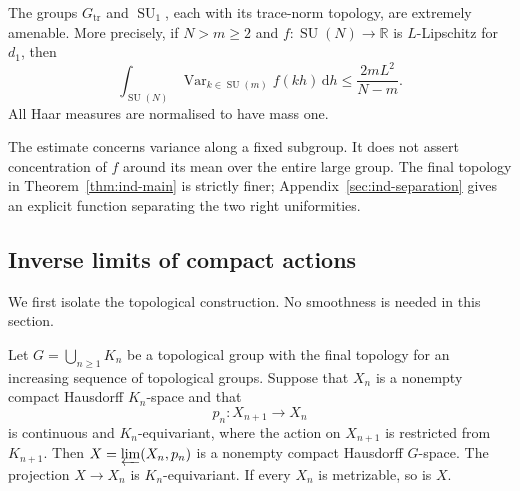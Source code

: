 \begin{theorem}\label{thm:ind-trace-intro}
The groups $G_{\mathrm{tr}}$ and $\operatorname{SU}_1$, each with its trace-norm topology, are
extremely amenable. More precisely, if
$N>m\ge2$ and $f:\operatorname{SU}(N)\to\mathbb R$ is $L$-Lipschitz for $d_1$, then
\begin{equation}\label{eq:ind-variance-intro}
\int_{\operatorname{SU}(N)}\operatorname{Var}_{k\in\operatorname{SU}(m)}f(kh)\,\mathrm d h
\le \frac{2mL^2}{N-m}.
\end{equation}
All Haar measures are normalised to have mass one.
\end{theorem}

The estimate concerns variance along a fixed subgroup. It does not
assert concentration of $f$ around its mean over the entire large
group. The final topology in Theorem~\ref{thm:ind-main} is strictly finer;
Appendix~\ref{sec:ind-separation} gives an explicit function separating
the two right uniformities.

\subsection{Inverse limits of compact actions}\label{sec:ind-inverse}

We first isolate the topological construction. No smoothness is needed
in this section.

\begin{lemma}\label{lem:ind-inverse-action}
Let $G=\bigcup_{n\ge1}K_n$ be a topological group with the final
topology for an increasing sequence of topological groups. Suppose
that $X_n$ is a nonempty compact Hausdorff $K_n$-space and that
\[
p_n:X_{n+1}\longrightarrow X_n
\]
is continuous and $K_n$-equivariant, where the action on $X_{n+1}$ is
restricted from $K_{n+1}$. Then $X=\varprojlim(X_n,p_n)$ is a nonempty
compact Hausdorff $G$-space. The projection $X\to X_n$ is
$K_n$-equivariant. If every $X_n$ is metrizable, so is $X$.
\end{lemma}

